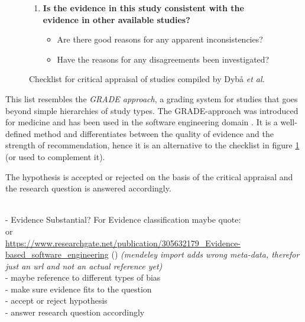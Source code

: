 \begin{figure}
{{\begin{enumerate}
	\begin{itemize}
	\item Are the study’s findings transferable to other industrial settings?
	\item Did the study evaluate all the important outcome measures?
	\item Does the study provide guidelines for practice based on the results?
	\item Are the guidelines well described and easy to use?
	\item Will the benefits of using the guidelines outweigh the costs?
	\end{itemize}
\item \textbf{Is the evidence in this study consistent with the evidence in other available studies?}
	\begin{itemize}
	\item Are there good reasons for any apparent inconsistencies?
	\item Have the reasons for any disagreements been investigated?
	\end{itemize}
\end{enumerate}
}}
\caption{Checklist for critical appraisal of studies compiled by Dyb{\aa} \emph{et al.} \cite{Dyba2005}}
\label{fig:critical appraisal}
\end{figure}

This list resembles the \emph{GRADE approach}, a grading system for studies that goes beyond simple hierarchies of study types. The GRADE-approach was introduced for medicine and has been used in the software engineering domain \cite{Wohlin2013EvidenceProfile}. It is a well-defined method and differentiates between the quality of evidence and the strength of recommendation, hence it is an alternative to the checklist in figure \ref{fig:critical appraisal} (or used to complement it).

The hypothesis is accepted or rejected on the basis of the critical appraisal and the research question is answered accordingly.

\\
- Evidence Substantial? For Evidence classification maybe quote:\\
\cite{Wohlin2013EvidenceProfile} or \\
\url{https://www.researchgate.net/publication/305632179_Evidence-based_software_engineering} () \textit{(mendeley import adds wrong meta-data, therefor just an url and not an actual reference yet)}\\
- maybe reference to different types of bias\\
- make sure evidence fits to the question\\
- accept or reject hypothesis\\
- answer research question accordingly\\
